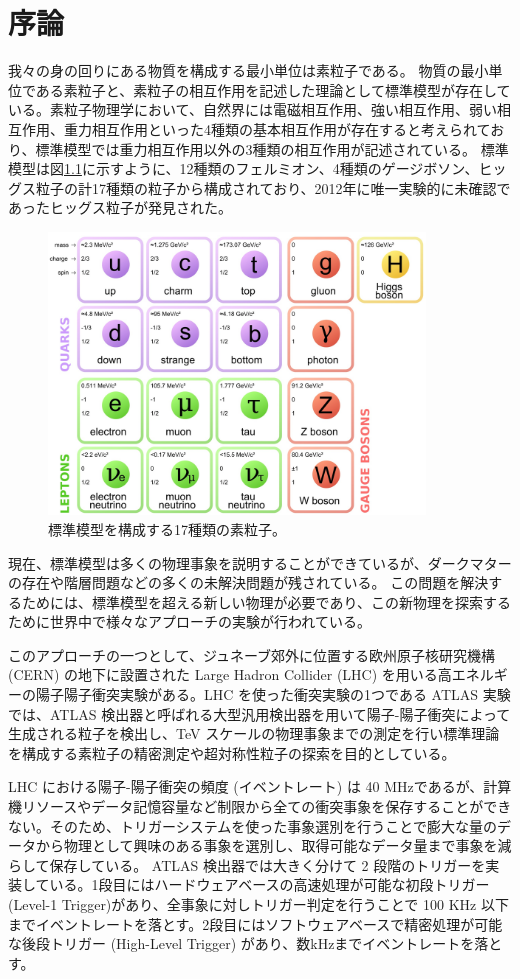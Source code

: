 \chapter{序論}
我々の身の回りにある物質を構成する最小単位は素粒子である。
物質の最小単位である素粒子と、素粒子の相互作用を記述した理論として標準模型が存在している。素粒子物理学において、自然界には電磁相互作用、強い相互作用、弱い相互作用、重力相互作用といった4種類の基本相互作用が存在すると考えられており、標準模型では重力相互作用以外の3種類の相互作用が記述されている。
標準模型は図\ref{fig:標準模型}に示すように、12種類のフェルミオン、4種類のゲージボソン、ヒッグス粒子の計17種類の粒子から構成されており、2012年に唯一実験的に未確認であったヒッグス粒子が発見された\cite{article:Higgs_boson}。
\begin{figure}[tb]
  \centering
  \includegraphics[clip, width=10cm]{fig/1/standardmodel.jpg}
  \caption{標準模型を構成する17種類の素粒子\cite{article:elementary_particles}。}
  \label{fig:標準模型}
\end{figure}

現在、標準模型は多くの物理事象を説明することができているが、ダークマターの存在や階層問題などの多くの未解決問題が残されている。
この問題を解決するためには、標準模型を超える新しい物理が必要であり、この新物理を探索するために世界中で様々なアプローチの実験が行われている。

このアプローチの一つとして、ジュネーブ郊外に位置する欧州原子核研究機構 (CERN) の地下に設置された Large Hadron Collider (LHC) を用いる高エネルギーの陽子陽子衝突実験がある。LHC を使った衝突実験の1つである ATLAS 実験では、ATLAS 検出器と呼ばれる大型汎用検出器を用いて陽子-陽子衝突によって生成される粒子を検出し、TeV スケールの物理事象までの測定を行い標準理論を構成する素粒子の精密測定や超対称性粒子の探索を目的としている。

LHC における陽子-陽子衝突の頻度 (イベントレート) は 40 MHzであるが、計算機リソースやデータ記憶容量など制限から全ての衝突事象を保存することができない。そのため、トリガーシステムを使った事象選別を行うことで膨大な量のデータから物理として興味のある事象を選別し、取得可能なデータ量まで事象を減らして保存している。
ATLAS 検出器では大きく分けて 2 段階のトリガーを実装している。1段目にはハードウェアベースの高速処理が可能な初段トリガー (Level-1 Trigger)があり、全事象に対しトリガー判定を行うことで 100 KHz 以下までイベントレートを落とす。2段目にはソフトウェアベースで精密処理が可能な後段トリガー (High-Level Trigger) があり、数kHzまでイベントレートを落とす。

